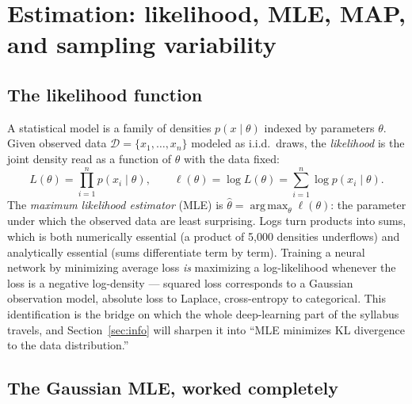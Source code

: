 \documentclass[11pt]{article}
\numberwithin{equation}{section}
\theoremstyle{plain}
\theoremstyle{definition}
\theoremstyle{remark}
\DeclareMathOperator*{\argmax}{arg\,max}
\begin{document}
\section{Estimation: likelihood, MLE, MAP, and sampling variability}\label{sec:estimation}

\subsection{The likelihood function}

A statistical model is a family of densities $p(x \mid \theta)$ indexed by parameters $\theta$. Given observed data $\mathcal{D} = \{x_1, \dots, x_n\}$ modeled as i.i.d.\ draws, the \emph{likelihood} is the joint density read as a function of $\theta$ with the data fixed:
\begin{equation}
L(\theta) = \prod_{i=1}^n p(x_i \mid \theta),
\qquad
\ell(\theta) = \log L(\theta) = \sum_{i=1}^n \log p(x_i \mid \theta).
\end{equation}
The \emph{maximum likelihood estimator} (MLE) is $\hat\theta = \argmax_\theta \ell(\theta)$: the parameter under which the observed data are least surprising. Logs turn products into sums, which is both numerically essential (a product of 5{,}000 densities underflows) and analytically essential (sums differentiate term by term). Training a neural network by minimizing average loss \emph{is} maximizing a log-likelihood whenever the loss is a negative log-density --- squared loss corresponds to a Gaussian observation model, absolute loss to Laplace, cross-entropy to categorical. This identification is the bridge on which the whole deep-learning part of the syllabus travels, and Section~\ref{sec:info} will sharpen it into ``MLE minimizes KL divergence to the data distribution.''

\subsection{The Gaussian MLE, worked completely}\label{sec:gaussmle}
\end{document}
